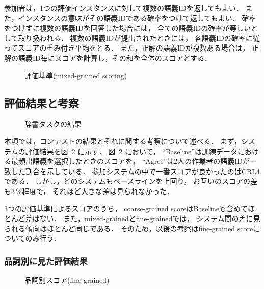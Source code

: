 \noindent
参加者は，1つの評価インスタンスに対して複数の語義IDを返してもよい．
また，インスタンスの意味がその語義IDである確率をつけて返してもよい．
確率をつけずに複数の語義IDを回答した場合には，
全ての語義IDの確率が等しいとして取り扱われる．
複数の語義IDが提出されたときには，
各語義IDの確率に従ってスコアの重み付き平均をとる．
また，正解の語義IDが複数ある場合は，
正解の語義ID毎にスコアを計算し，その和を全体のスコアとする．

\begin{figure}[tbp]
  \begin{center}
    \caption{評価基準(mixed-grained scoring)}
    \label{fig:mixed-grained}
  \end{center}
\end{figure}

\subsection{評価結果と考察}
\label{sec:results}

\begin{figure}[tbp]
  \begin{center}
    \caption{辞書タスクの結果}
    \label{fig:res}
  \end{center}
\end{figure}

本項では，コンテストの結果とそれに関する考察について述べる．
まず，システムの評価結果を図~\ref{fig:res} に示す．
図~\ref{fig:res} において，
``Baseline''は訓練データにおける最頻出語義を選択したときのスコアを，
``Agree''は2人の作業者の語義IDが一致した割合を示している．
参加システムの中で一番スコアが良かったのはCRL4である．
しかし，どのシステムもベースラインを上回り，
お互いのスコアの差も3\,\%程度で，
それほど大きな差は見られなかった．

3つの評価基準によるスコアのうち，
coarse-grained scoreはBaselineも含めてほとんど差はない．
また，mixed-grainedとfine-grainedでは，
システム間の差に見られる傾向はほとんど同じである．
そのため，以後の考察はfine-grained scoreについてのみ行う．

\subsubsection{品詞別に見た評価結果}
\label{sec:results-pos}


\begin{figure}[tbp]
  \begin{center}
   
    \caption{品詞別スコア(fine-grained)}
    \label{fig:res-pos}
  \end{center}
\end{figure}

